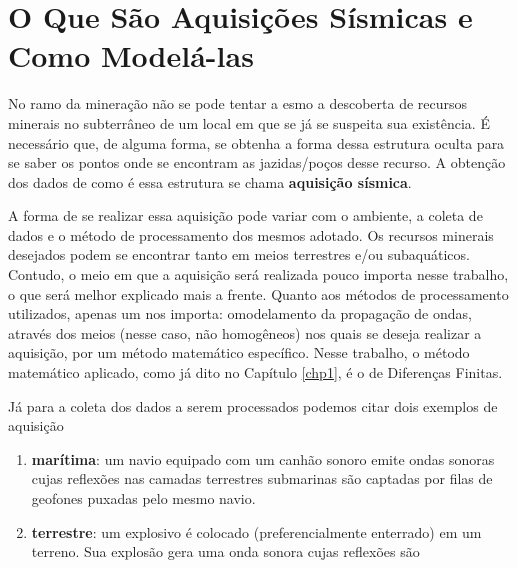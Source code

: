 \section{O Que São Aquisições Sísmicas e Como Modelá-las}

	No ramo da mineração não se pode tentar a esmo a descoberta de recursos
	minerais no subterrâneo de um local em que se já se suspeita sua existência.
	É necessário que, de alguma forma, se obtenha a forma dessa estrutura oculta
	para se saber os pontos onde se encontram as jazidas/poços desse recurso.
	A obtenção dos dados de como é essa estrutura se chama \textbf{aquisição
	sísmica}.

	A forma de se realizar essa aquisição pode variar com o ambiente, a coleta
	de dados e o método de processamento dos mesmos	adotado. Os recursos
	minerais desejados podem se encontrar tanto em meios terrestres e/ou
	subaquáticos. Contudo, o meio em que a aquisição será realizada pouco
	importa nesse trabalho, o que será melhor explicado mais a
	frente. Quanto aos métodos de processamento utilizados, apenas um nos
	importa: omodelamento da propagação de ondas, através dos meios (nesse caso,
	não homogêneos) nos quais se deseja realizar a aquisição, por um método
	matemático específico. Nesse trabalho, o método matemático aplicado, como já
	dito no Capítulo \ref{chp1}, é o de Diferenças Finitas.

	Já para a coleta dos dados a serem processados podemos citar dois exemplos
	de aquisição
	\begin{enumerate}
		\item \textbf{marítima}: um navio equipado com um canhão
		sonoro emite ondas sonoras cujas reflexões nas camadas terrestres
		submarinas são captadas por filas de geofones puxadas pelo mesmo navio.

		\item \textbf{terrestre}: um explosivo é colocado (preferencialmente
		enterrado) em um terreno. Sua explosão gera uma onda sonora cujas
		reflexões são 
	\end{enumerate}
